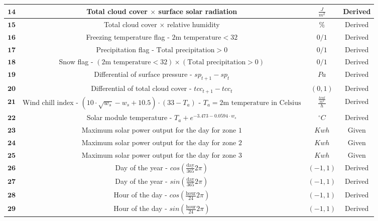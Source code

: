 \documentclass{article}
\begin{document}
\begin{table}[H]
\begin{adjustbox}{width=1\textwidth}
\begin{tabular}{|c|c|c|c|}
    $\textbf{14}$ & Total cloud cover $\times$ surface solar radiation & $\frac{J}{m^2}$ & Derived \\
    \hline
    $\textbf{15}$ & Total cloud cover $\times$ relative humidity & $\%$ & Derived \\
    \hline
    $\textbf{16}$ & Freezing temperature flag - $\text{2m temperature} < 32$ & $0/1$ & Derived \\
    \hline
    $\textbf{17}$ & Precipitation flag - $\text{Total precipitation} > 0$ & $0/1$ & Derived \\
    \hline
    $\textbf{18}$ & Snow flag - $(\text{2m temperature} < 32) \times (\text{Total precipitation} > 0)$ & $0/1$ & Derived \\
    \hline
    $\textbf{19}$ & Differential of surface pressure - $sp_{t+1} - sp_t$ & $Pa$ & Derived \\
    \hline
    $\textbf{20}$ & Differential of total cloud cover - $tcc_{t+1} - tcc_{t}$ & $(0,1)$ & Derived \\
    \hline
    $\textbf{21}$ & Wind chill index - $(10 \cdot \sqrt{w_s} - w_s + 10.5) \cdot (33 - T_a)$ - $T_a = 2\text{m temperature in Celsius}$ & $\frac{\frac{kcal}{m^2}}{h}$ & Derived \\
    \hline
    $\textbf{22}$ & Solar module temperature - $T_a + e^{-3.473 - 0.0594\cdot w_s}$ & $^\circ C$ & Derived \\
    \hline
    $\textbf{23}$ & Maximum solar power output for the day for zone $1$ & $Kwh$ & Given \\
    \hline
    $\textbf{24}$ & Maximum solar power output for the day for zone $2$ & $Kwh$ & Given \\
    \hline
    $\textbf{25}$ & Maximum solar power output for the day for zone $3$ & $Kwh$ & Given \\
    \hline
    $\textbf{26}$ & Day of the year - $cos(\frac{\text{day}}{365}2\pi)$ & $(-1,1)$ & Derived \\
    \hline
    $\textbf{27}$ & Day of the year - $sin(\frac{\text{day}}{365}2\pi)$ & $(-1,1)$ & Derived \\
    \hline
    $\textbf{28}$ & Hour of the day - $cos(\frac{\text{hour}}{24}2\pi)$ & $(-1,1)$ & Derived \\
    \hline
    $\textbf{29}$ & Hour of the day - $sin(\frac{\text{hour}}{24}2\pi)$ & $(-1,1)$ & Derived \\
    \hline
  \end{tabular}
  \end{adjustbox}
\end{table}
\end{document}
